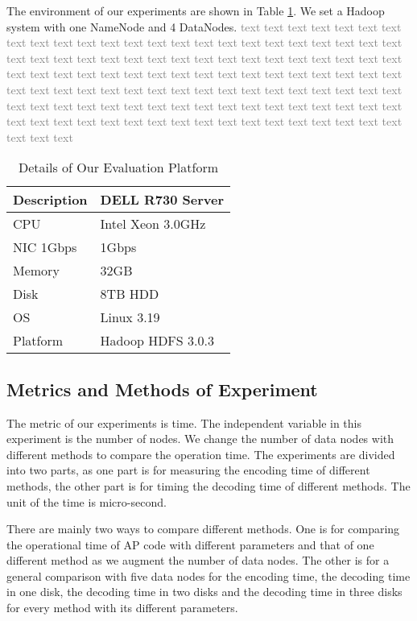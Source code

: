 \documentclass[sigconf]{acmart}
\begin{document}
The environment of our experiments are shown in Table \ref{tab-platform}. We set a Hadoop system with one NameNode and 4 DataNodes. \textcolor{gray}{text text text text text text text text text text text text text text text text text text text text text text text text text text text text text text text text text text text text text text text text text text text text text text text text text text text text text text text text text text text text text text text text text text text text text text text text text text text text text text text text text text text text text text text text text text text text text text text text text text text text text text text text text text text text text text text text }

\begin{table}[]
\begin{tabular}{|l|l|}
\hline
Description & DELL R730 Server \\ \hline
CPU & Intel Xeon 3.0GHz \\ \hline
NIC 1Gbps & 1Gbps \\ \hline
Memory & 32GB \\ \hline
Disk & 8TB HDD \\ \hline
OS & Linux 3.19 \\ \hline
Platform & Hadoop HDFS 3.0.3 \\ \hline
\end{tabular}
\caption{Details of Our Evaluation Platform}\label{tab-platform}
\end{table}

\subsection{Metrics and Methods of Experiment}
The metric of our experiments is time. The independent variable in this experiment is the number of nodes. We change the number of data nodes with different methods to compare the operation time. The experiments are divided into two parts, as one part is for measuring the encoding time of different methods, the other part is for timing the decoding time of different methods. The unit of the time is micro-second.\par

There are mainly two ways to compare different methods. One is for comparing the operational time of AP code with different parameters and that of one different method as we augment the number of data nodes. The other is for a general comparison with five data nodes for the encoding time, the decoding time in one disk, the decoding time in two disks and the decoding time in three disks for every method with its different parameters.\par
\end{document}
